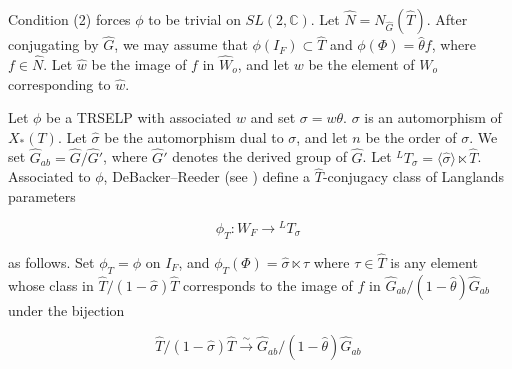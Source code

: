 \documentclass[11pt]{amsart}
\theoremstyle{plain}
\theoremstyle{definition}
\begin{document}
Condition (2) forces $\phi$ to be trivial on $SL(2,\mathbb{C})$.  Let
$\hat{N} = N_{\hat{G}}(\hat{T})$.  After conjugating by $\hat{G}$, we
may assume that $\phi(I_F) \subset \hat{T}$ and $\phi(\Phi) = \hat{\theta} f$,
where $f \in \hat{N}$.  Let $\hat{w}$ be the image of $f$ in
$\hat{W}_o$, and let $w$ be the element of $W_o$ corresponding to $\hat{w}$.

Let $\phi$ be a TRSELP with associated $w$ and set $\sigma = w \theta$.
$\sigma$ is an automorphism of $X_*(T)$.  Let $\hat{\sigma}$ be the
automorphism dual to $\sigma$, and let $n$ be the order of $\sigma$.
We set $\hat{G}_{ab} = \hat{G} / \hat{G}'$, where $\hat{G}'$ denotes
the derived group of $\hat{G}$. Let
${}^L T_{\sigma} = \langle \hat{\sigma} \rangle \ltimes \hat{T}$.
Associated to $\phi$, DeBacker--Reeder (see \cite[Chapter
4]{debackerreeder}) define a $\hat{T}$-conjugacy class of Langlands
parameters

\begin{equation}
\phi_T : W_F \rightarrow {}^L T_{\sigma} \ \label{phiT}
\end{equation}

\noindent as follows.  Set $\phi_T = \phi$ on $I_F$, and
$\phi_T(\Phi) = \hat{\sigma} \ltimes \tau$ where $\tau \in \hat{T}$
is any element whose class in $\hat{T} / (1 - \hat{\sigma}) \hat{T}$
corresponds to the image of $f$ in $\hat{G}_{ab} / (1 - \hat{\theta}) \hat{G}_{ab}$
under the bijection

\begin{equation}
\hat{T} / (1 - \hat{\sigma}) \hat{T} \stackrel{\sim}{\rightarrow} \hat{G}_{ab} / (1 - \hat{\theta}) \hat{G}_{ab} \ \label{bijectionfortau}
\end{equation}
\end{document}
